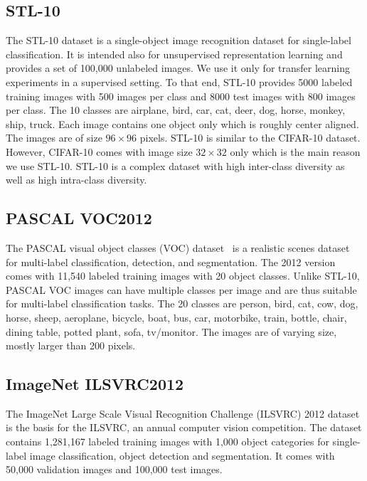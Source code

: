 \documentclass[a4paper,12pt]{report}
\begin{document}
\subsection{STL-10}
The STL-10 \cite{singleLayerNetworks} dataset is a single-object image recognition dataset for single-label classification. It is intended also for unsupervised representation learning and provides a set of 100,000 unlabeled images. We use it only for transfer learning experiments in a supervised setting. To that end, STL-10 provides 5000 labeled training images with 500 images per class and 8000 test images with 800 images per class. The 10 classes are airplane, bird, car, cat, deer, dog, horse, monkey, ship, truck. Each image contains one object only which is roughly center aligned. The images are of size $96 \times 96$ pixels. STL-10 is similar to the CIFAR-10 dataset. However, CIFAR-10 comes with image size $32 \times 32$ only which is the main reason we use STL-10. STL-10 is a complex dataset with high inter-class diversity as well as high intra-class diversity.


\subsection{PASCAL VOC2012}
The PASCAL visual object classes (VOC) dataset~\cite{PascalVocDataset} is a realistic scenes dataset for multi-label classification, detection, and segmentation. The 2012 version comes with 11,540 labeled training images with 20 object classes. Unlike STL-10, PASCAL VOC images can have multiple classes per image and are thus suitable for multi-label classification tasks. The 20 classes are person, bird, cat, cow, dog, horse, sheep, aeroplane, bicycle, boat, bus, car, motorbike, train, bottle, chair, dining table, potted plant, sofa, tv/monitor. The images are of varying size, mostly larger than 200 pixels.


\subsection{ImageNet ILSVRC2012}
The ImageNet Large Scale Visual Recognition Challenge (ILSVRC) 2012 dataset \cite{ILSVRC2012} is the basis for the ILSVRC, an annual computer vision competition. The dataset contains 1,281,167 labeled training images with 1,000 object categories for single-label image classification, object detection and segmentation. It comes with 50,000 validation images and 100,000 test images. 
\end{document}
